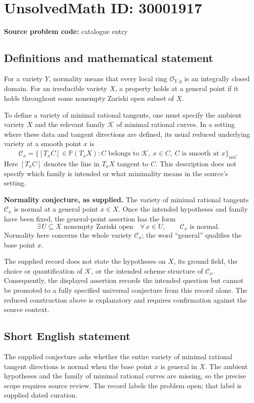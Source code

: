 \documentclass[11pt]{article}
\begin{document}
\section*{UnsolvedMath ID: 30001917}
\textbf{Source problem code:} catalogue entry
\subsection{Definitions and mathematical statement}
For a variety \(Y\), normality means that every local ring \(\mathcal O_{Y,y}\) is an integrally closed domain. For an irreducible variety \(X\), a property holds at a general point if it holds throughout some nonempty Zariski open subset of \(X\).

To define a variety of minimal rational tangents, one must specify the ambient variety \(X\) and the relevant family \(\mathcal K\) of minimal rational curves. In a setting where these data and tangent directions are defined, its usual reduced underlying variety at a smooth point \(x\) is
\[
\mathcal C_x=\overline{\{[T_xC]\in\mathbb P(T_xX): C\text{ belongs to }\mathcal K,\ x\in C,\ C\text{ is smooth at }x\}}_{\mathrm{red}}.
\]
Here \([T_xC]\) denotes the line in \(T_xX\) tangent to \(C\). This description does not specify which family is intended or what minimality means in the source's setting.

\textbf{Normality conjecture, as supplied.} The variety of minimal rational tangents \(\mathcal C_x\) is normal at a general point \(x\in X\). Once the intended hypotheses and family have been fixed, the general-point assertion has the form
\[
\exists\,U\subseteq X\text{ nonempty Zariski open}\quad
\forall\,x\in U,\qquad \mathcal C_x\text{ is normal}.
\]
Normality here concerns the whole variety \(\mathcal C_x\); the word ``general'' qualifies the base point \(x\).

The supplied record does not state the hypotheses on \(X\), its ground field, the choice or quantification of \(\mathcal K\), or the intended scheme structure of \(\mathcal C_x\). Consequently, the displayed assertion records the intended question but cannot be promoted to a fully specified universal conjecture from this record alone. The reduced construction above is explanatory and requires confirmation against the source context.
\subsection{Short English statement}
The supplied conjecture asks whether the entire variety of minimal rational tangent directions is normal when the base point \(x\) is general in \(X\). The ambient hypotheses and the family of minimal rational curves are missing, so the precise scope requires source review. The record labels the problem open; that label is supplied dated curation.
\end{document}

